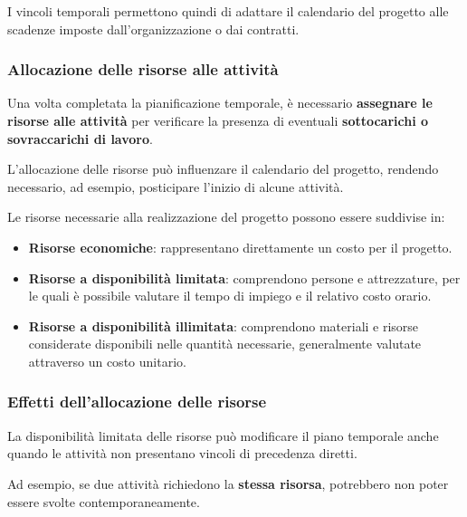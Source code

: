\noindent I vincoli temporali permettono quindi di adattare
il calendario del progetto alle scadenze imposte
dall'organizzazione o dai contratti.

\medskip


\subsubsection*{Allocazione delle risorse alle attività}

\noindent Una volta completata la pianificazione temporale,
è necessario \textbf{assegnare le risorse alle attività}
per verificare la presenza di eventuali
\textbf{sottocarichi o sovraccarichi di lavoro}.

\medskip

\noindent L'allocazione delle risorse può influenzare
il calendario del progetto, rendendo necessario,
ad esempio, posticipare l'inizio di alcune attività.

\medskip

\noindent Le risorse necessarie alla realizzazione
del progetto possono essere suddivise in:

\begin{itemize}
    \item \textbf{Risorse economiche}: rappresentano
    direttamente un costo per il progetto.

    \item \textbf{Risorse a disponibilità limitata}:
    comprendono persone e attrezzature, per le quali
    è possibile valutare il tempo di impiego
    e il relativo costo orario.

    \item \textbf{Risorse a disponibilità illimitata}:
    comprendono materiali e risorse considerate
    disponibili nelle quantità necessarie,
    generalmente valutate attraverso un costo unitario.
\end{itemize}

\medskip


\subsubsection*{Effetti dell'allocazione delle risorse}

\noindent La disponibilità limitata delle risorse può
modificare il piano temporale anche quando le attività
non presentano vincoli di precedenza diretti.

\medskip

\noindent Ad esempio, se due attività richiedono
la \textbf{stessa risorsa}, potrebbero non poter
essere svolte contemporaneamente.

